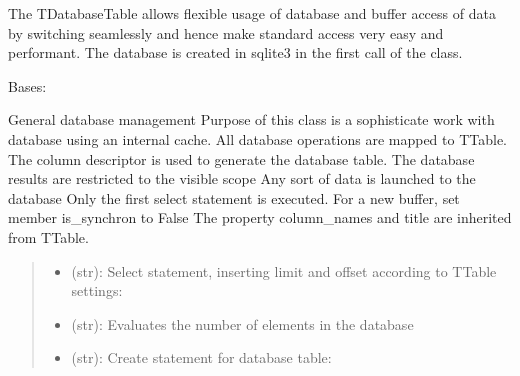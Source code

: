 \documentclass[letterpaper,10pt,english]{sphinxmanual}
\begin{document}
\sphinxAtStartPar
The TDatabaseTable allows flexible usage of database and buffer access of data by switching seamlessly
and hence make standard access very easy and performant.
The database is created in sqlite3 in the first call of the class.

\begin{savenotes}\begin{fulllineitems}
\label{\detokenize{eezz:eezz.database.TDatabaseTable}}
\pysigstartsignatures
{}
\pysigstopsignatures
\sphinxAtStartPar
Bases: 

\sphinxAtStartPar
General database management
Purpose of this class is a sophisticate work with database using an internal cache. All database
operations are mapped to TTable. The column descriptor is used to generate the database table.
The database results are restricted to the visible scope
Any sort of data is launched to the database
Only the first select statement is executed. For a new buffer, set member is\_synchron to False
The property column\_names and title are inherited from TTable.
\begin{quote}\begin{description}
\begin{itemize}
\item {} 
\sphinxAtStartPar
{} \textendash{} (str):   Select statement, inserting limit and offset according to TTable settings:

\item {} 
\sphinxAtStartPar
{} \textendash{} (str):    Evaluates the number of elements in the database 

\item {} 
\sphinxAtStartPar
{} \textendash{} (str):    Create statement for database table:


\end{itemize}
\end{description}
\end{quote}
\end{fulllineitems}
\end{savenotes}
\end{document}
